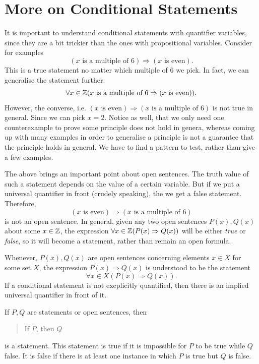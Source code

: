 \section{More on Conditional Statements}
It is important to understand conditional statements with quantifier variables, since they are a bit trickier than the ones with propositional variables. Consider for examples 
$$
(x \text{ is a multiple of } 6)\Rightarrow (x\text{ is even}).
$$
This is a true statement no matter which multiple of $6$ we pick. In fact, we can generalise the statement further: 
$$
\forall x\in\mathbb{Z}(x \text{ is a multiple of } 6 \Rightarrow (x \text{ is even})). 
$$
However, the converse, i.e. $(x \text{ is even}) \Rightarrow (x \text{ is a multiple of } 6)$ is not true in general. Since we can pick $x=2$. 
Notice as well, that we only need one counterexample to prove some principle does not hold in genera, whereas coming up with many examples in order to generalise a principle is not a guarantee that the principle holds in general. We have to find a pattern to test, rather than give a few examples. 

The above brings an important point about open sentences. The truth value of such a statement depends on the value of a certain variable. But if we put a universal quantifier in front (crudely speaking), the we get a false statement. Therefore, 
$$
(x \text{ is even}) \Rightarrow (x \text{ is a multiple of } 6)
$$
is not an open sentence. In general, given any two open sentences $P(x), Q(x)$ about some $x\in\mathbb{Z}$, the expression $\forall x\in\mathbb{Z}(P(x)\Rightarrow Q(x))$ will be either \emph{true} or \emph{false}, so it will become a statement, rather than remain an open formula. 

Whenever, $P(x),Q(x)$ are open sentences concerning elements $x\in X$ for some set $X$, the expression $P(x)\Rightarrow Q(x)$ is understood to be the statement 
$$
\forall x\in X(P(x)\Rightarrow Q(x)).
$$
If a conditional statement is not excplicitly quantified, then there is an implied universal quantifier in front of it. 
\begin{defn}
    If $P,Q$ are statements or open sentences, then 
    \begin{quote}
        If $P$, then $Q$
    \end{quote}
    is a statement. This statement is true if it is impossible for $P$ to be true while $Q$ false. It is false if there is at least one instance in which $P$ is true but $Q$ is false. 
\end{defn}

